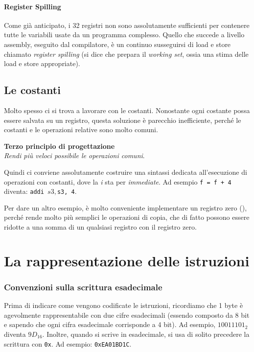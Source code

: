 \documentclass[class=book, crop=false, oneside]{standalone}
\begin{document}
\paragraph{Register Spilling}
Come già anticipato, i 32 registri non sono assolutamente sufficienti per contenere tutte le variabili usate da un programma complesso. Quello che succede a livello assembly, eseguito dal compilatore, è un continuo susseguirsi di load e store chiamato \emph{register spilling} (si dice che prepara il \emph{working set}, ossia una stima delle load e store appropriate).

\subsection*{Le costanti}
Molto spesso ci si trova a lavorare con le costanti. Nonostante ogni costante possa essere salvata su un registro, questa soluzione è parecchio inefficiente, perché le costanti e le operazioni relative sono molto comuni.

\vspace{8pt}
\begin{tcolorbox}
\centering
\textbf{Terzo principio di progettazione}\\
\emph{Rendi più veloci possibile le operazioni comuni}.
\end{tcolorbox}
\vspace{5pt}

Quindi ci conviene assolutamente costruire una sintassi dedicata all'esecuzione di operazioni con costanti, dove la \emph{i} sta per \emph{immediate}. Ad esempio \texttt{f = f + 4} diventa: \texttt{addi $s3, $s3, 4}.

Per dare un altro esempio, è molto conveniente implementare un registro zero (), perché rende molto più semplici le operazioni di copia, che di fatto possono essere ridotte a una somma di un qualsiasi registro con il registro zero.

\section{La rappresentazione delle istruzioni}

\subsubsection{Convenzioni sulla scrittura esadecimale}
Prima di indicare come vengono codificate le istruzioni, ricordiamo che 1 byte è agevolmente rappresentabile con due cifre esadecimali (essendo composto da 8 bit e sapendo che ogni cifra esadecimale corrisponde a 4 bit). Ad esempio, \(1001 1101_{2}\) diventa \(9D_{16}\). Inoltre, quando si scrive in esadecimale, si usa di solito precedere la scrittura con \texttt{0x}. Ad esempio: \texttt{0xEA01BD1C}.
\end{document}
